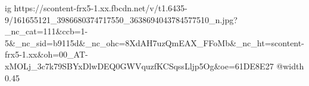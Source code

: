 
 
 
 
 

\ifcmt
  ig https://scontent-frx5-1.xx.fbcdn.net/v/t1.6435-9/161655121_3986680374717550_3638694043784577510_n.jpg?_nc_cat=111&ccb=1-5&_nc_sid=b9115d&_nc_ohc=8XdAH7uzQmEAX_FFoMb&_nc_ht=scontent-frx5-1.xx&oh=00_AT-xMOLj_3c7k79SBYxDlwDEQ0GWVquzfKCSqssLljp5Og&oe=61DE8E27
  @width 0.45
\fi
